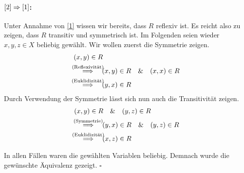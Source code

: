\documentclass[9pt,fleqn,twoside,a4paper]{article}
\renewcommand{\implies}{\quad\Longrightarrow\quad}
\newcommand{\qedBox}{\hfill\ensuremath{\square}}
\begin{document}
\begin{multicols}{2}
    \paragraph{$\ref{2}\Rightarrow\ref{1}$:} %
      Unter Annahme von \ref{1} wissen wir bereits, dass $R$ reflexiv ist.
      Es reicht also zu zeigen, dass $R$ transitiv und symmetrisch ist.
      Im Folgenden seien wieder $x,y,z\in X$ beliebig gewählt.
      Wir wollen zuerst die Symmetrie zeigen.
      \begin{align*}
        &(x,y)\in R \\
        &\stackrel{\mathclap{\text{(Reflexivität)}}}{\implies} (x,y)\in R \quad\&\quad (x,x)\in R \\
        &\stackrel{\mathclap{\text{(Euklidizität)}}}{\implies} (y,x)\in R
      \end{align*}
      Durch Verwendung der Symmetrie lässt sich nun auch die Transitivität zeigen.
      \begin{align*}
        &(x,y)\in R \quad\&\quad (y,z)\in R \\
        &\stackrel{\mathclap{\text{(Symmetrie)}}}{\implies} (y,x)\in R \quad\&\quad (y,z)\in R \\
        &\stackrel{\mathclap{\text{(Euklidizität)}}}{\implies} (x,z)\in R
      \end{align*}

    In allen Fällen waren die gewählten Variablen beliebig.
    Demnach wurde die gewünschte Äquivalenz gezeigt. \qedBox

  \end{multicols}
\end{document}
